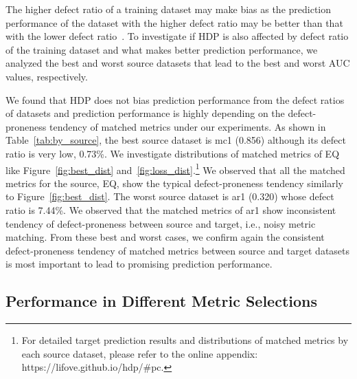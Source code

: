 The higher defect ratio of a training dataset may make bias as the prediction performance of the dataset with the higher defect ratio may be better than that with the lower defect ratio~\cite{Tantithamthavorn16}. To investigate if HDP is also affected by defect ratio of the training dataset and what makes better prediction performance, we analyzed the best and worst source datasets that lead to the best and worst AUC values, respectively.

We found that HDP does not bias prediction performance from the defect ratios of datasets and prediction performance is highly depending on the defect-proneness tendency of matched metrics under our experiments.
As shown in Table~\ref{tab:by_source}, the best source dataset is mc1 (0.856) although its defect ratio is very low, 0.73\%. We investigate distributions of matched metrics of EQ like Figure~\ref{fig:best_dist} and~\ref{fig:loss_dist}.\footnote{For detailed target prediction results and distributions of matched metrics by each source dataset, please refer to the online appendix: https://lifove.github.io/hdp/\#pc.} We observed that all the matched metrics for the source, EQ, show the typical defect-proneness tendency similarly to Figure~\ref{fig:best_dist}. The worst source dataset is ar1 (0.320) whose defect ratio is 7.44\%. We observed that the matched metrics of ar1 show inconsistent tendency of defect-proneness between source and target, i.e., noisy metric matching. From these best and worst cases, we confirm again the consistent defect-proneness tendency of matched metrics between source and target datasets is most important to lead to promising prediction performance.





\subsection{Performance in Different Metric Selections}
\label{subsec04}

